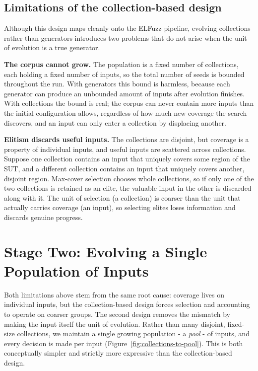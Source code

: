 \subsection{Limitations of the collection-based design}
\label{sec:collection-limits}

Although this design maps cleanly onto the ELFuzz pipeline, evolving collections rather than generators introduces two problems that do not arise when the unit of evolution is a true generator.

\textbf{The corpus cannot grow.} The population is a fixed number of collections, each holding a fixed number of inputs, so the total number of seeds is bounded throughout the run. With generators this bound is harmless, because each generator can produce an unbounded amount of inputs after evolution finishes. With collections the bound is real; the corpus can never contain more inputs than the initial configuration allows, regardless of how much new coverage the search discovers, and an input can only enter a collection by displacing another.

\textbf{Elitism discards useful inputs.} The collections are disjoint, but coverage is a property of individual inputs, and useful inputs are scattered across collections. Suppose one collection contains an input that uniquely covers some region of the SUT, and a different collection contains an input that uniquely covers another, disjoint region. Max-cover selection chooses whole collections, so if only one of the two collections is retained as an elite, the valuable input in the other is discarded along with it. The unit of selection (a collection) is coarser than the unit that actually carries coverage (an input), so selecting elites loses information and discards genuine progress.

\section{Stage Two: Evolving a Single Population of Inputs}

Both limitations above stem from the same root cause: coverage lives on individual inputs, but the collection-based design forces selection and accounting to operate on coarser groups. The second design removes the mismatch by making the input itself the unit of evolution. Rather than many disjoint, fixed-size collections, we maintain a single growing population - a \textit{pool} - of inputs, and every decision is made per input (Figure~\ref{fig:collections-to-pool}). This is both conceptually simpler and strictly more expressive than the collection-based design.

